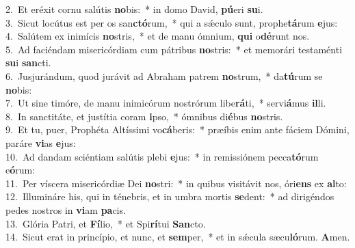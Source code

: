 {2.~}Et eréxit cornu salútis \textbf{no}bis:~* in domo David, \textbf{pú}eri \textbf{su}i.\\
{3.~}Sicut locútus est per os san\textbf{ctó}rum,~* qui a sǽculo sunt, prophe\textbf{tá}rum \textbf{e}jus:\\
{4.~}Salútem ex inimícis \textbf{no}stris,~* et de manu ómnium, \textbf{qui} o\textbf{dé}runt nos.\\
{5.~}Ad faciéndam misericórdiam cum pátribus \textbf{no}stris:~* et memorári testaménti \textbf{su}i \textbf{san}cti.\\
{6.~}Jusjurándum, quod jurávit ad Abraham patrem \textbf{no}strum,~* da\textbf{tú}rum se \textbf{no}bis:\\
{7.~}Ut sine timóre, de manu inimicórum nostrórum libe\textbf{rá}ti,~* servi\textbf{á}mus \textbf{il}li.\\
{8.~}In sanctitáte, et justítia coram \textbf{i}pso,~* ómnibus di\textbf{é}bus \textbf{no}stris.\\
{9.~}Et tu, puer, Prophéta Altíssimi vo\textbf{cá}beris:~* præíbis enim ante fáciem Dómini, paráre \textbf{vi}as \textbf{e}jus:\\
{10.~}Ad dandam sciéntiam salútis plebi \textbf{e}jus:~* in remissiónem pecca\textbf{tó}rum e\textbf{ó}rum:\\
{11.~}Per víscera misericórdiæ Dei \textbf{no}stri:~* in quibus visitávit nos, óri\textbf{ens} ex \textbf{al}to:\\
{12.~}Illumináre his, qui in ténebris, et in umbra mortis \textbf{se}dent:~* ad dirigéndos pedes nostros in \textbf{vi}am \textbf{pa}cis.\\
{13.~}Glória Patri, et \textbf{Fí}lio,~* et Spi\textbf{rí}tui \textbf{San}cto.\\
{14.~}Sicut erat in princípio, et nunc, et \textbf{sem}per,~* et in sǽcula sæcu\textbf{ló}rum. \textbf{A}men.\\
